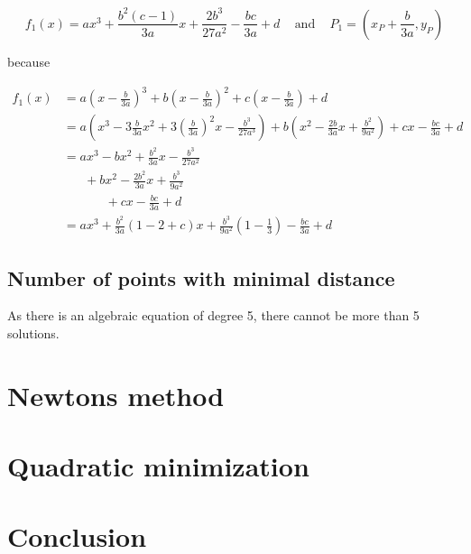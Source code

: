 \documentclass[a4paper]{scrartcl}
\theoremstyle{break}
\theoremstyle{nonumberplain}
\begin{document}
\[f_1(x) = ax^3 + \frac{b^2 (c-1)}{3a} x + \frac{2b^3}{27 a^2} - \frac{bc}{3a} + d \;\;\;\text{ and }\;\;\;P_1 = (x_P + \frac{b}{3a}, y_P)\]

because

\begin{align}
    f_1(x) &= a \left (x - \frac{b}{3a} \right )^3 + b \left (x-\frac{b}{3a} \right )^2 + c \left (x-\frac{b}{3a} \right ) + d\\
           &= a \left (x^3 - 3 \frac{b}{3a}x^2 + 3 (\frac{b}{3a})^2 x - \frac{b^3}{27a^3} \right )
             +b \left (x^2 - \frac{2b}{3a} x + \frac{b^2}{9a^2} \right )
             +c x - \frac{bc}{3a} + d\\
            &= ax^3 - bx^2 + \frac{b^2}{3a}x - \frac{b^3}{27 a^2}\\
            & \;\;\;\;\;\;+ bx^2 - \frac{2b^2}{3a}x + \frac{b^3}{9a^2}\\
            & \;\;\;\;\;\;\;\;\;\;\;\; + c x - \frac{bc}{3a} + d\\
            &= ax^3 + \frac{b^2}{3a}\left (1-2+c \right )x + \frac{b^3}{9a^2} \left (1-\frac{1}{3} \right )- \frac{bc}{3a} + d
\end{align}


\subsection{Number of points with minimal distance}
As there is an algebraic equation of degree 5, there cannot be more
than 5 solutions.

\section{Newtons method}

\section{Quadratic minimization}

\section{Conclusion}
\end{document}
